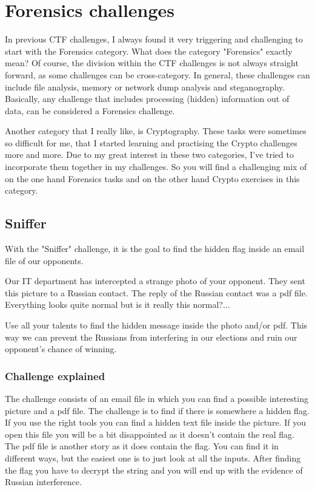 \documentclass[../main.tex]{subfiles}
\begin{document}
\section{Forensics challenges}
In previous CTF challenges, I always found it very triggering and challenging to start with the Forensics category. What does the category "Forensics" exactly mean? Of course, the division within the CTF challenges is not always straight forward, as some challenges can be cross-category. In general, these challenges can include file analysis, memory or network dump analysis and steganography. Basically, any challenge that includes processing (hidden) information out of data, can be considered a Forensics challenge. 

Another category that I really like, is Cryptography. These tasks were sometimes so difficult for me, that I started learning and practising the Crypto challenges more and more. Due to my great interest in these two categories, I've tried to incorporate them together in my challenges. So you will find a challenging mix of on the one hand Forensics tasks and on the other hand Crypto exercises in this category.

\subsection{Sniffer}
With the "Sniffer" challenge, it is the goal to find the hidden flag inside an email file of our opponents.

Our IT department has intercepted a strange photo of your opponent. They sent this picture to a Russian contact. The reply of the Russian contact was a pdf file. Everything looks quite normal but is it really this normal?...

Use all your talents to find the hidden message inside the photo and/or pdf. This way we can prevent the Russians from interfering in our elections and ruin our opponent's chance of winning.

\subsubsection{Challenge explained}
The challenge consists of an email file in which you can find a possible interesting picture and a pdf file. The challenge is to find if there is somewhere a hidden flag. If you use the right tools you can find a hidden text file inside the picture. If you open this file you will be a bit disappointed as it doesn't contain the real flag. The pdf file is another story as it does contain the flag. You can find it in different ways, but the easiest one is to just look at all the inputs. After finding the flag you have to decrypt the string and you will end up with the evidence of Russian interference.
\end{document}
